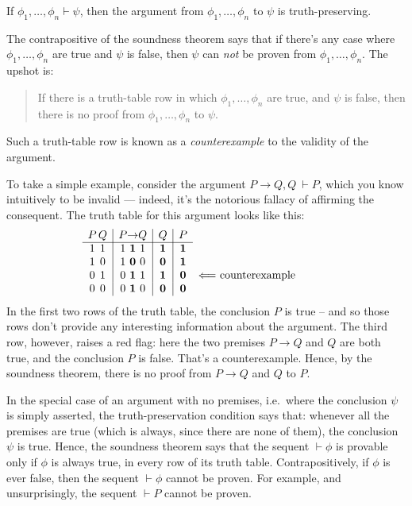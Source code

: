 \begin{sothm} If $\phi _1,\dots ,\phi _n\vdash \psi$, then
  the argument from $\phi _1,\dots ,\phi _n$ to $\psi$ is
  truth-preserving. \end{sothm}

The contrapositive of the \gls{soundness theorem} says that if there's
any case where $\phi _1,\dots ,\phi _n$ are true and $\psi$ is false,
then $\psi$ can {\it not} be proven from $\phi _1,\dots ,\phi _n$.
The upshot is:
\begin{quote} If there is a truth-table row in which
  $\phi _1,\dots ,\phi _n$ are true, and $\psi$ is false, then there
  is no proof from $\phi _1,\dots ,\phi _n$ to $\psi$. \end{quote}
Such a truth-table row is known as a \emph{\gls{counterexample}} to
the validity of the argument.


To take a simple example, consider the argument $P\to Q,Q\:\vdash P$,
which you know intuitively to be invalid --- indeed, it's the
notorious fallacy of affirming the consequent.  The truth table for
this argument looks like this:
\[ \begin{array}{ c@{\, }c | c@{ }c@{ }c@{ }c@{ }c | c | c p{4cm} }
P & Q &  & P & \rightarrow & Q &  & Q & P\\
\cline{1-9} 
1 & 1 &  & 1 & \mathbf{1} & 1 &  & \mathbf{1} & \mathbf{1}\\
1 & 0 &  & 1 & \mathbf{0} & 0 &  & \mathbf{0} & \mathbf{1}\\
0 & 1 &  & 0 & \mathbf{1} & 1 &  & \mathbf{1} & \mathbf{0} &
                                                             $\Longleftarrow$
                                                             counterexample \\
0 & 0 &  & 0 & \mathbf{1} & 0 &  & \mathbf{0} & \mathbf{0}\\
   \end{array} \]
In the first two rows of the truth table, the conclusion $P$ is true
-- and so those rows don't provide any interesting information about
the argument.  The third row, however, raises a red flag: here the two
premises $P\to Q$ and $Q$ are both true, and the conclusion $P$ is
false.  That's a counterexample.  Hence, by the soundness theorem,
there is no proof from $P\to Q$ and $Q$ to $P$.

In the special case of an argument with no premises, i.e.\ where the
conclusion $\psi$ is simply asserted, the truth-preservation condition
says that: whenever all the premises are true (which is always, since
there are none of them), the conclusion $\psi$ is true.  Hence, the
soundness theorem says that the sequent $\vdash\phi$ is provable only
if $\phi$ is always true, in every row of its truth table.
Contrapositively, if $\phi$ is ever false, then the sequent
$\vdash\phi$ cannot be proven.  For example, and unsurprisingly, the
sequent $\vdash P$ cannot be proven.

